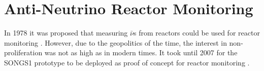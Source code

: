 \section{Anti-Neutrino Reactor Monitoring}
In 1978 it was proposed that measuring $\bar{\nu}$s from reactors could be used for reactor monitoring \cite{Borovoi_1978}. However, due to the geopolitics of the time, the interest in non-proliferation was not as high as in modern times. It took until 2007 for the SONGS1 prototype to be deployed as proof of concept for reactor monitoring \cite{Bowden_2007}.
